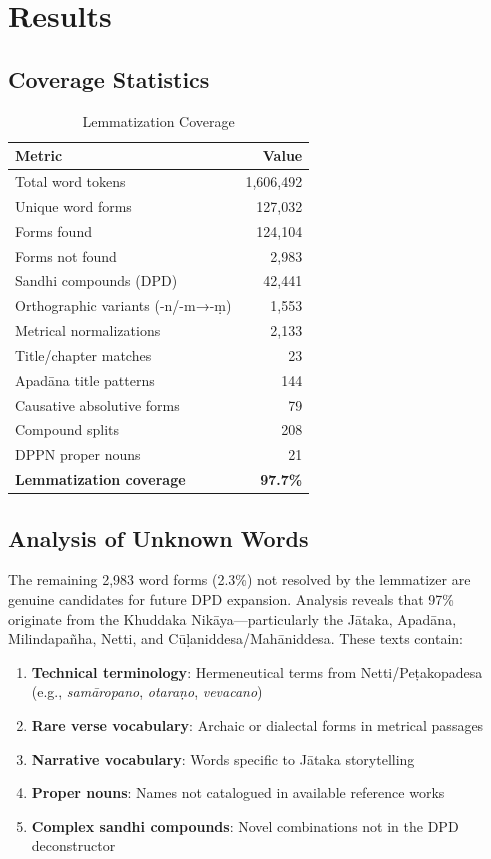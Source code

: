 \documentclass[unnumsec,webpdf,contemporary,large]{oup-authoring-template}
\begin{document}
\section{Results}

\subsection{Coverage Statistics}

\begin{table}[h]
\centering
\caption{Lemmatization Coverage}
\begin{tabular}{lr}
\toprule
Metric & Value \\
\midrule
Total word tokens & 1,606,492 \\
Unique word forms & 127,032 \\
Forms found & 124,104 \\
Forms not found & 2,983 \\
Sandhi compounds (DPD) & 42,441 \\
Orthographic variants (-n/-m→-ṃ) & 1,553 \\
Metrical normalizations & 2,133 \\
Title/chapter matches & 23 \\
Apadāna title patterns & 144 \\
Causative absolutive forms & 79 \\
Compound splits & 208 \\
DPPN proper nouns & 21 \\
\midrule
\textbf{Lemmatization coverage} & \textbf{97.7\%} \\
\bottomrule
\end{tabular}
\end{table}

\subsection{Analysis of Unknown Words}

The remaining 2,983 word forms (2.3\%) not resolved by the lemmatizer are genuine candidates for future DPD expansion. Analysis reveals that 97\% originate from the Khuddaka Nikāya---particularly the Jātaka, Apadāna, Milindapañha, Netti, and Cūḷaniddesa/Mahāniddesa. These texts contain:

\begin{enumerate}
\item \textbf{Technical terminology}: Hermeneutical terms from Netti/Peṭakopadesa (e.g., \emph{samāropano}, \emph{otaraṇo}, \emph{vevacano})
\item \textbf{Rare verse vocabulary}: Archaic or dialectal forms in metrical passages
\item \textbf{Narrative vocabulary}: Words specific to Jātaka storytelling
\item \textbf{Proper nouns}: Names not catalogued in available reference works
\item \textbf{Complex sandhi compounds}: Novel combinations not in the DPD deconstructor
\end{enumerate}
\end{document}
